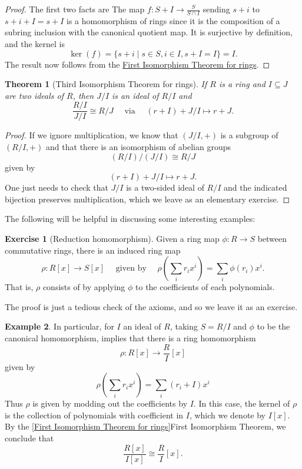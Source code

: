 \documentclass[12pt]{report}
\newtheorem{theorem}{Theorem}[chapter]
\numberwithin{equation}{section}
\numberwithin{theorem}{chapter}
\theoremstyle{definition}
\newtheorem{example}[theorem]{Example}
\newtheorem{exercise}{Exercise}
\newtheorem*{basic properties}{Basic Properties}
\newtheorem*{Important Remark}{Important Remark}
\renewcommand{\ker}{\operatorname{ker}}
\begin{document}
\begin{proof} 
The first two facts are 
The map $f\!: S+I \to \frac{S}{S\cap I}$ sending $s+i$ to $s+i+I = s+I$ is a homomorphism of rings since it is the composition of a subring inclusion with the canonical quotient map. It is surjective by definition, and the kernel is 
$$\ker(f) = \{ s+i \mid s \in S, i \in I, s+I = I\} = I.$$
The result now follows from the \hyperref[First Isomorphism Theorem for rings]{First Isomorphism Theorem for rings}.
\end{proof}


\begin{theorem}[Third Isomorphism Theorem for rings] \label{Third Isomorphism Theorem for rings}
If $R$ is a ring and $I \subseteq J $ are two ideals of $R$, then $J/I$ is an ideal of $R/I$ and
$$\frac{R/I}{J/I} \cong R/J \quad \text{ via } \quad (r + I) + J/I \longmapsto r + J.$$
\end{theorem}

\begin{proof} 
If we ignore multiplication, we know that $(J/I,+)$ is a subgroup of $(R/I,+)$ and that there is an isomorphism of abelian groups 
$$(R/I)/(J/I) \cong R/J$$ 
given by  
$$(r + I) + J/I \mapsto r + J.$$
One just needs to check that $J/I$ is a two-sided ideal of $R/I$ and the indicated bijection preserves multiplication, which we leave as an elementary exercise.
\end{proof}



The following will be helpful in discussing some interesting examples:



\begin{exercise}[Reduction homomorphism]\label{polynomials reduction homomorphism}
Given a ring map $\phi\!: R \to S$ between commutative rings, there is an induced ring map
$$\rho\!: R[x] \to S[x] \quad \text{ given by } \quad \rho\left(\sum_i r_i x^i\right)=\sum_i \phi(r_i) x^i.$$
That is, $\rho$ consists of by applying $\phi$ to the coefficients of each polynomials.
\end{exercise}

The proof is just a tedious check of the axioms, and so we leave it as an exercise. 

\begin{example} 
In particular, for $I$ an ideal of $R$, taking $S = R/I$ and $\phi$ to be the canonical homomorphism,  implies that there is a ring homomorphism 
$$\rho\!: R[x] \to \frac{R}{I}[x]$$ 
given by 
$$\rho\left(\sum_i r_i x^i\right) = \sum_i (r_i + I) x^i$$ 
Thus $\rho$ is given by modding out the coefficients by $I$. In this case, the kernel of $\rho$ is the collection of polynomials with coefficient in $I$, which we denote by $I[x]$. By the \ref{First Isomorphism Theorem for rings}{First Isomorphism Theorem}, we conclude that
$$\frac{R[x]}{I[x]} \cong \frac{R}{I}[x].$$
\end{example}
\end{document}
